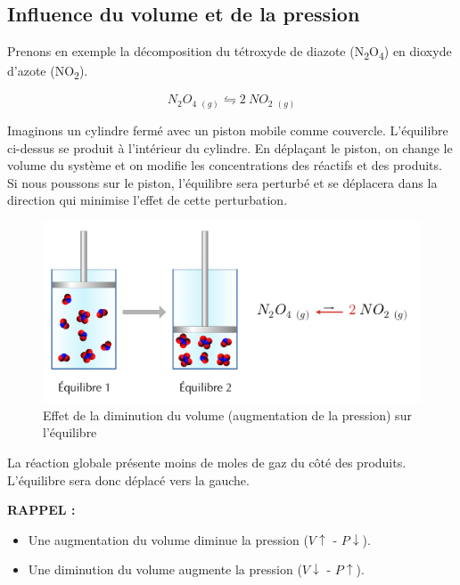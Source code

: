 \documentclass[
  11pt,
  a4paper,
  openany]{book}
\providecommand{\tightlist}{%
  \setlength{\itemsep}{0pt}\setlength{\parskip}{0pt}}
\begin{document}
\hypertarget{influence-du-volume-et-de-la-pression}{%
\subsection{Influence du volume et de la pression}\label{influence-du-volume-et-de-la-pression}}

Prenons en exemple la décomposition du tétroxyde de diazote (N\textsubscript{2}O\textsubscript{4}) en dioxyde d'azote (NO\textsubscript{2}).

\[
  N_2O_4\ {}_{(g)} \leftrightharpoons 2\ NO_2\ {}_{(g)}
\]

Imaginons un cylindre fermé avec un piston mobile comme couvercle. L'équilibre ci-dessus se produit à l'intérieur du cylindre. En déplaçant le piston, on change le volume du système et on modifie les concentrations des réactifs et des produits. Si nous poussons sur le piston, l'équilibre sera perturbé et se déplacera dans la direction qui minimise l'effet de cette perturbation.

\clearpage

\begin{figure}

{\centering \includegraphics[width=0.75\linewidth]{images/equilibres-pressions-1} 

}

\caption{Effet de la diminution du volume (augmentation de la pression) sur l'équilibre}\label{fig:equilibres-pressions-1}
\end{figure}

La réaction globale présente moins de moles de gaz du côté des produits. L'équilibre sera donc déplacé vers la gauche.

\textbf{RAPPEL :}

\begin{itemize}
\tightlist
\item
  Une augmentation du volume diminue la pression (\(V \uparrow\) - \(P \downarrow\)).
\item
  Une diminution du volume augmente la pression (\(V \downarrow\) - \(P \uparrow\)).
\end{itemize}
\end{document}
